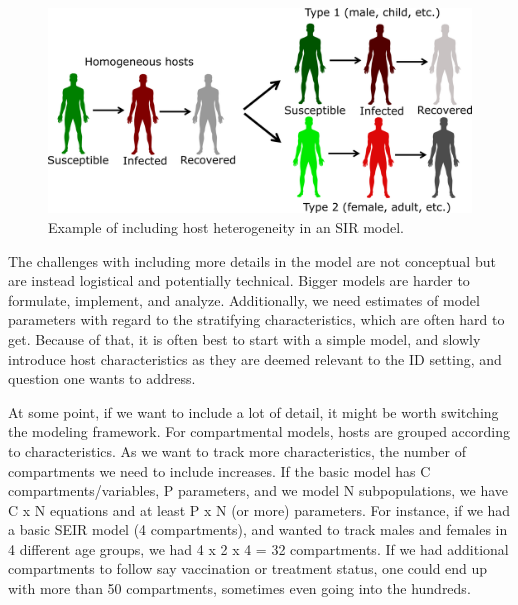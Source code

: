 \documentclass[]{book}
\theoremstyle{definition}
\theoremstyle{definition}
\theoremstyle{definition}
\theoremstyle{remark}
\begin{document}
\begin{figure}
\centering
\includegraphics{./images/heterogeneityexample.png}
\caption{\label{fig:heterogeneity}Example of including host heterogeneity in
an SIR model.}
\end{figure}

The challenges with including more details in the model are not
conceptual but are instead logistical and potentially technical. Bigger
models are harder to formulate, implement, and analyze. Additionally, we
need estimates of model parameters with regard to the stratifying
characteristics, which are often hard to get. Because of that, it is
often best to start with a simple model, and slowly introduce host
characteristics as they are deemed relevant to the ID setting, and
question one wants to address.

At some point, if we want to include a lot of detail, it might be worth
switching the modeling framework. For compartmental models, hosts are
grouped according to characteristics. As we want to track more
characteristics, the number of compartments we need to include
increases. If the basic model has C compartments/variables, P
parameters, and we model N subpopulations, we have C x N equations and
at least P x N (or more) parameters. For instance, if we had a basic
SEIR model (4 compartments), and wanted to track males and females in 4
different age groups, we had 4 x 2 x 4 = 32 compartments. If we had
additional compartments to follow say vaccination or treatment status,
one could end up with more than 50 compartments, sometimes even going
into the hundreds.
\end{document}
